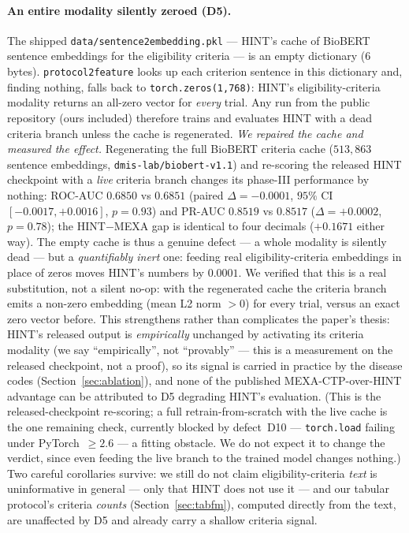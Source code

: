 \documentclass[a4paper,fleqn]{cas-sc}
\begin{document}
\paragraph{An entire modality silently zeroed (D5).} The shipped
\texttt{data/sentence2embedding.pkl} --- HINT's cache of BioBERT sentence embeddings for the
eligibility criteria --- is an empty dictionary (6 bytes). \texttt{protocol2feature} looks up
each criterion sentence in this dictionary and, finding nothing, falls back to
\texttt{torch.zeros(1,768)}: HINT's eligibility-criteria modality returns an all-zero vector
for \emph{every} trial. Any run from the public repository (ours included) therefore trains
and evaluates HINT with a dead criteria branch unless the cache is regenerated.
\emph{We repaired the cache and measured the effect.} Regenerating the full BioBERT criteria
cache ($513{,}863$ sentence embeddings, \texttt{dmis-lab/biobert-v1.1}) and re-scoring the
released HINT checkpoint with a \emph{live} criteria branch changes its phase-III performance by
nothing: ROC-AUC $0.6850$ vs $0.6851$ (paired $\Delta=-0.0001$, $95\%$ CI $[-0.0017,+0.0016]$,
$p=0.93$) and PR-AUC $0.8519$ vs $0.8517$ ($\Delta=+0.0002$, $p=0.78$); the HINT$-$MEXA gap is
identical to four decimals ($+0.1671$ either way). The empty cache is thus a genuine defect --- a
whole modality is silently dead --- but a \emph{quantifiably inert} one: feeding real
eligibility-criteria embeddings in place of zeros moves HINT's numbers by $0.0001$. We verified
that this is a real substitution, not a silent no-op: with the regenerated cache the criteria
branch emits a non-zero embedding (mean L2 norm $>0$) for every trial, versus an exact zero vector
before. This strengthens rather than complicates the paper's thesis: HINT's released output is
\emph{empirically} unchanged by activating its criteria modality (we say ``empirically'', not
``provably'' --- this is a measurement on the released checkpoint, not a proof), so its signal is
carried in practice by the disease codes (Section~\ref{sec:ablation}), and none of the published
MEXA-CTP-over-HINT advantage can be attributed to D5 degrading HINT's evaluation. (This is the released-checkpoint re-scoring; a
full retrain-from-scratch with the live cache is the one remaining check, currently blocked by
defect~D10 --- \texttt{torch.load} failing under PyTorch~$\ge2.6$ --- a fitting obstacle. We do
not expect it to change the verdict, since even feeding the live branch to the trained model
changes nothing.) Two careful corollaries survive: we still do not claim eligibility-criteria
\emph{text} is uninformative in general --- only that HINT does not use it --- and our tabular
protocol's criteria \emph{counts} (Section~\ref{sec:tabfm}), computed directly from the text,
are unaffected by D5 and already carry a shallow criteria signal.
\end{document}

